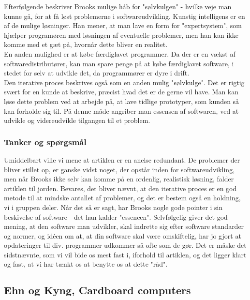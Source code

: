 \documentclass[11pt]{article}
\begin{document}
Efterfølgende beskriver Brooks mulige håb for "sølvkulgen" - hvilke veje man kunne gå, for at få løst problemerne i softwareudvikling. Kunstig intelligens er en af de mulige løsninger. Han mener, at man lave en form for "expertsystem", som hjælper programøren med løsningen af eventuelle problemer, men han kan ikke komme med et gæt på, hvornår dette bliver en realitet.\\
 En anden mulighed er at købe færdiglavet programmer. Da der er en vækst af softwaredistributører, kan man spare penge på at købe færdiglavet software, i stedet for selv at udvikle det, da programmører er dyre i drift.\\ 
Den iterative proces beskrives også som en anden mulig "sølvkulge". Det er rigtig svært for en kunde at beskrive, præcist hvad det er de gerne vil have. Man kan løse dette problem ved at arbejde på, at lave tidlige prototyper, som kunden så kan forholde sig til. På denne måde angriber man essensen af softwaren, ved at udvikle og videreudvikle tilgangen til et problem.
\subsubsection{Tanker og spørgsmål}
Umiddelbart ville vi mene at artiklen er en anelse redundant. De problemer der bliver stillet op, er ganske vidst noget, der opstår inden for softwareudvikling, men når Brooks ikke selv kan komme på en ordenlig, realistisk løsning, falder artiklen til jorden. Bevares, det bliver nævnt, at den iterative proces er en god metode til at mindske antallet af problemer, og det er bestem også en holdning, vi i gruppen deler. Når det så er sagt, har Brooks nogle gode pointer i sin beskivelse af software - det han kalder "essencen". Selvfølgelig giver det god mening, at den software man udvikler, skal indrette sig efter software standarder og normer, og idéen om at, at din software skal være omskiftelig, har jo gjort at opdateringer til div. programmer udkommer så ofte som de gør. Det er måske det sidstnævnte, som vi vil bide os mest fast i, iforhold til artiklen, og det ligger klart og fast, at vi har tænkt os at benytte os at dette "råd".  


\pagebreak
\subsection{Ehn og Kyng, Cardboard computers}
\end{document}
